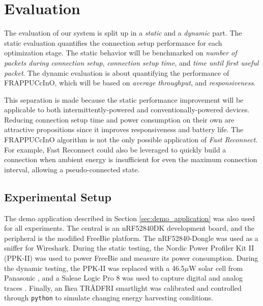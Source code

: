\chapter{Evaluation}
\label{chp:chapter_4}
The evaluation of our system is split up in a \textit{static} and a \textit{dynamic} part. The static evaluation quantifies the connection setup performance for each optimization stage. The static behavior will be benchmarked on \textit{number of packets during connection setup}, \textit{connection setup time}, and \textit{time until first useful packet}. The dynamic evaluation is about quantifying the performance of FRAPPUCcInO, which will be based on \textit{average throughput}, and \textit{responsiveness}.

This separation is made because the static performance improvement will be applicable to both intermittently-powered and conventionally-powered devices. Reducing connection setup time and power consumption on their own are attractive propositions since it improves responsiveness and battery life. The FRAPPUCcInO algorithm is not the only possible application of \textit{Fast Reconnect}. For example, Fast Reconnect could also be leveraged to quickly build a connection when ambient energy is insufficient for even the maximum connection interval, allowing a pseudo-connected state. 

\section{Experimental Setup}
\label{sec:evaluation_setup}
The demo application described in Section \ref{sec:demo_application} was also used for all experiments. The central is an nRF52840DK development board, and the peripheral is the modified FreeBie platform. The nRF52840-Dongle was used as a sniffer for Wireshark. During the static testing, the Nordic Power Profiler Kit II (PPK-II) was used to power FreeBie and measure its power consumption. During the dynamic testing, the PPK-II was replaced with a 46.5$\mu\text{W}$ solar cell from Panasonic \cite{panasonic_solar}, and a Saleae Logic Pro 8 was used to capture digital and analog traces \cite{saleae_logic_pro_8}. Finally, an Ikea TRÅDFRI smartlight was calibrated and controlled through \texttt{python} to simulate changing energy harvesting conditions. 

